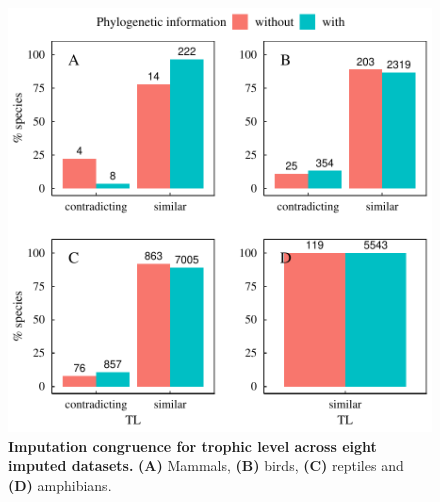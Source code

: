 \documentclass[11pt]{article}
\begin{document}
\begin{figure}[h!]
\centering
\includegraphics[scale=0.6]{figures/Congruence_categorical_traits/TL}
\caption[Imputation congruence for trophic level across eight imputed datasets]{\textbf{Imputation congruence for trophic level across eight imputed datasets.} \textbf{(A)} Mammals, \textbf{(B)} birds, \textbf{(C)} reptiles and \textbf{(D)} amphibians.}
\label{congruenceTL}
\end{figure}
\end{document}
